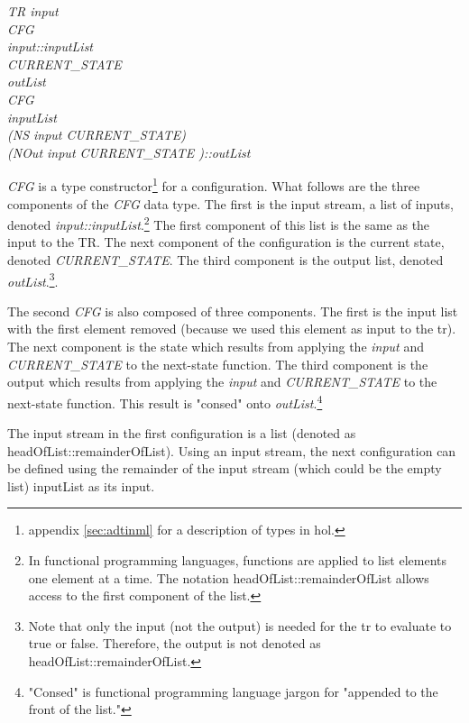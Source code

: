 \documentclass[../../main/main.tex]{subfiles}
\begin{document}
\emph{
TR input\\
\hspace{0.5cm}CFG \\
\hspace{1.5cm}input::inputList\\
\hspace{1.5cm}CURRENT_STATE\\
\hspace{1.5cm}outList\\
\hspace{0.5cm}CFG\\
\hspace{1.5cm}inputList\\
\hspace{1.5cm}(NS input CURRENT_STATE)\\
\hspace{1.5cm}(NOut input CURRENT_STATE )::outList
}

\emph{CFG} is a type constructor\footnote{\see appendix \ref{sec:adtinml} for a description of types in \gls{hol}.} for a configuration.  What follows are the three components of the \emph{CFG} data type.  The first is the input stream, a list of inputs, denoted \emph{input::inputList}.\footnote{In functional programming languages, functions are applied to list elements one element at a time.  The notation headOfList::remainderOfList allows access to the first component of the list.}  The first component of this list is the same as the input to the TR.  The next component of the configuration is the current state, denoted \emph{CURRENT_STATE}.  The third component is the output list, denoted \emph{outList}.\footnote{Note that only the input (not the output) is needed for the \gls{tr} to evaluate to true or false. Therefore, the output is not denoted as headOfList::remainderOfList.}.  

The second \emph{CFG} is also composed of three components.  The first is the input list with the first element removed (because we used this element as input to the \gls{tr}).  The next component is the state which results from applying the \emph{input} and \emph{CURRENT_STATE} to the next-state function.  The third component is the output which results from applying the \emph{input} and \emph{CURRENT_STATE} to the next-state function.  This result is "consed" onto \emph{outList}.\footnote{"Consed" is functional programming language jargon for "appended to the front of the list."}

The input stream in the first configuration is a list (denoted as headOfList::remainderOfList).  Using an input stream, the next configuration can be defined using the remainder of the input stream (which could be the empty list) inputList as its input. 
\end{document}
